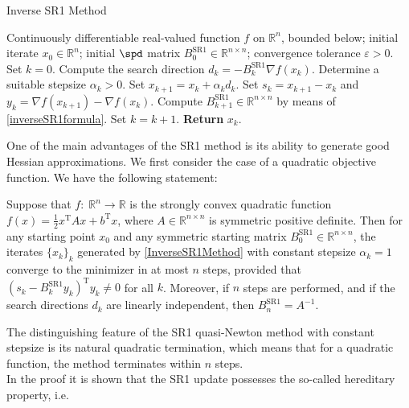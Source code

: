 \begin{algorithm}[H]
    \caption{Inverse SR1 Method}\label{InverseSR1Method}
    \begin{algorithmic}[1]
        \State Continuously differentiable real-valued function $f$ on $\mathbb{R}^n$, bounded below; initial iterate $x_0 \in \mathbb{R}^n$; initial $\spd$ matrix $B^{\mathrm{SR1}}_0 \in \mathbb{R}^{n \times n}$; convergence tolerance $\varepsilon > 0$. Set $k = 0$.
            \State Compute the search direction $d_k = - B^{\mathrm{SR1}}_k \nabla f(x_k)$.
            \State Determine a suitable stepsize $\alpha_k > 0$.
            \State Set $x_{k+1} = x_k + \alpha_k d_k$.
            \State Set $s_k = x_{k+1} - x_k$ and $y_k = \nabla f(x_{k+1}) - \nabla f(x_k)$.
            \State Compute $B^{\mathrm{SR1}}_{k+1} \in \mathbb{R}^{n \times n}$ by means of \cref{inverseSR1formula}. 
            \State Set $k = k+1$.
        \EndWhile
        \State \textbf{Return} $x_k$.
    \end{algorithmic}
\end{algorithm}

One of the main advantages of the SR1 method is its ability to generate good Hessian approximations. We first consider the case of a quadratic objective function. We have the following statement:

\begin{theorem}
    Suppose that $f \colon \; \mathbb{R}^n \to \mathbb{R}$ is the strongly convex quadratic function $f(x) = \frac{1}{2} x^{\mathrm{T}} A x + b^{\mathrm{T}} x$, where $A \in \mathbb{R}^{n \times n}$ is symmetric positive definite. Then for any starting point $x_0$ and any symmetric starting matrix $B^{\mathrm{SR1}}_0 \in \mathbb{R}^{n \times n}$, the iterates $\{x_k\}_k$ generated by \cref{InverseSR1Method} with constant stepsize $\alpha_k = 1$ converge to the minimizer in at most $n$ steps, provided that $(s_k - B^\mathrm{SR1}_k y_k)^{\mathrm{T}} y_k \neq 0$ for all $k$. Moreover, if $n$ steps are performed, and if the search directions $d_k$ are linearly independent, then $B^{\mathrm{SR1}}_n = A^{−1}$.
\end{theorem}

The distinguishing feature of the SR1 quasi-Newton method with constant stepsize is its natural quadratic termination, which means that for a quadratic function, the method terminates within $n$ steps. \\
In the proof it is shown that the SR1 update possesses the so-called hereditary property, i.e. 

